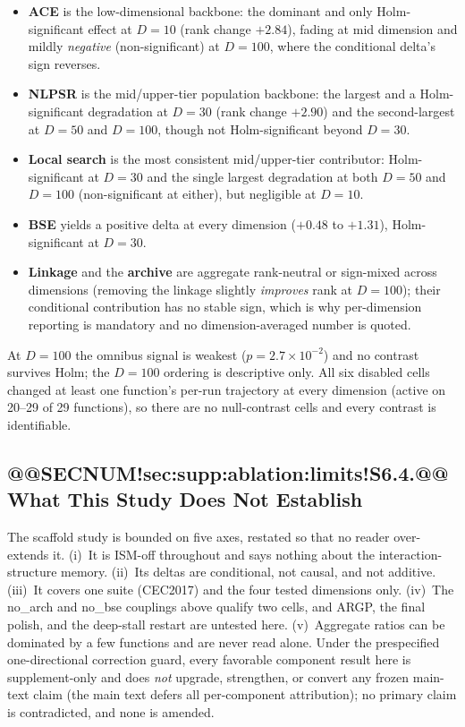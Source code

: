 \documentclass[10pt,a4paper]{article}
\begin{document}
\begin{itemize}
\item \textbf{ACE} is the low-dimensional backbone: the dominant and only
Holm-significant effect at $D=10$ (rank change $+2.84$), fading at mid
dimension and mildly \emph{negative} (non-significant) at $D=100$, where the
conditional delta's sign reverses.
\item \textbf{NLPSR} is the mid/upper-tier population backbone: the
largest and a Holm-significant degradation at $D=30$ (rank change $+2.90$)
and the second-largest at $D=50$ and $D=100$, though not Holm-significant
beyond $D=30$.
\item \textbf{Local search} is the most consistent mid/upper-tier
contributor: Holm-significant at $D=30$ and the single largest
degradation at both $D=50$ and $D=100$ (non-significant at either), but
negligible at $D=10$.
\item \textbf{BSE} yields a positive delta at every dimension ($+0.48$
to $+1.31$), Holm-significant at $D=30$.
\item \textbf{Linkage} and the \textbf{archive} are aggregate rank-neutral or
sign-mixed across dimensions (removing the linkage slightly \emph{improves}
rank at $D=100$); their conditional contribution has no stable sign, which is
why per-dimension reporting is mandatory and no dimension-averaged number is
quoted.
\end{itemize}



At $D=100$ the omnibus signal is weakest ($p = 2.7\times10^{-2}$) and
no contrast survives Holm; the $D=100$ ordering is descriptive only.  All six
disabled cells changed at least one function's per-run trajectory at every
dimension (active on 20--29 of 29 functions), so there are no null-contrast
cells and every contrast is identifiable.

\subsection{@@SECNUM!sec:supp:ablation:limits!S6.4.@@ What This Study Does Not Establish}\label{sec:supp:ablation:limits}

The scaffold study is bounded on five axes, restated so that no reader
over-extends it.  (i)~It is ISM-off throughout and says nothing about the
interaction-structure memory.  (ii)~Its deltas are conditional, not causal,
and not additive.  (iii)~It covers one suite (CEC2017) and the four tested
dimensions only.  (iv)~The no\_arch and no\_bse couplings
above qualify two cells, and ARGP, the final polish, and the deep-stall
restart are untested here.  (v)~Aggregate ratios can be dominated by a few
functions and are never read alone.  Under the prespecified one-directional
correction guard, every favorable component result here is supplement-only and
does \emph{not} upgrade, strengthen, or convert any frozen main-text claim
(the main text defers all per-component attribution); no primary claim is
contradicted, and none is amended.
\end{document}
